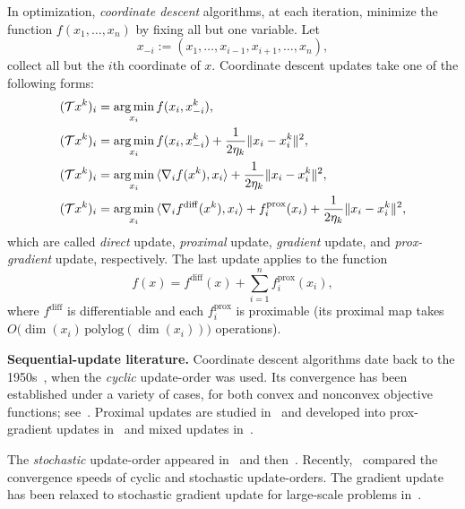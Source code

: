 In optimization,  \emph{coordinate descent} algorithms, at each iteration, minimize the function $f(x_1,\ldots,x_n)$ by fixing all but one variable. Let $$x_{-i}:=(x_1,\ldots,x_{i-1},x_{i+1},\ldots,x_n),$$
collect all but the $i$th coordinate of $x$. Coordinate descent updates take one of the following forms:
\begin{subequations}\label{coordes}
\begin{align}
(\cT x^k)_i & = \argmin_{x_i}f(x_i,x_{-i}^k),\\
(\cT x^k)_i & = \argmin_{x_i}f(x_i,x_{-i}^k)+\frac{1}{2\eta_k}\|x_i-x_i^k\|^2,\\
(\cT x^k)_i & = \argmin_{x_i}\,\langle \nabla_i f(x^k),x_i \rangle+\frac{1}{2\eta_k}\|x_i-x_i^k\|^2,\\
(\cT x^k)_i & = \argmin_{x_i}\,\langle \nabla_i f^{\mathrm{diff}}(x^k),x_i \rangle+f_i^{\mathrm{prox}}(x_i)+\frac{1}{2\eta_k}\|x_i-x_i^k\|^2,
\end{align}
\end{subequations}
which are called \emph{direct} update, \emph{proximal} update,  \emph{gradient} update, and \emph{prox-gradient} update, respectively. The last update applies to the function $$f(x) = f^{\mathrm{diff}}(x)+\sum_{i=1}^nf^{\mathrm{prox}}_i(x_i),$$ where $f^{\mathrm{diff}}$ is differentiable and each $f^{\mathrm{prox}}_i$ is proximable (its proximal map takes $O\big(\dim(x_i)\,\mathrm{polylog}(\dim(x_i))\big)$ operations).


\textbf{Sequential-update literature.} Coordinate descent algorithms date back to the 1950s~\cite{hildreth1957quadprog}, when the \emph{cyclic} update-order was used. Its convergence has been established under a variety of cases, for both convex and nonconvex objective functions; see~\cite{Warga-63,zadeh1970note, Sargent-Sebastian-73,Han-88,luo1992convergence, Tseng-93, Grippo-Sciandrone-00, Tseng-01, razaviyayn2013unified, beck2013convergence, hong2015iteration, wright2015coordinate}. Proximal updates are studied in~\cite{Grippo-Sciandrone-00, attouch2010proximal} and developed into prox-gradient updates in~\cite{tseng2009_CGD, tseng2009block-linear, bolte2014proximal} and mixed updates in~\cite{XY_2013_multiblock}.

The \emph{stochastic} update-order appeared in~\cite{nesterov2012cd} and then~\cite{richtarik2014iteration, Lu_Xiao_rbcd_2015}. Recently,~\cite{XY_2014_ecd,Xu2015_APG_NTD} compared the convergence speeds of cyclic and stochastic update-orders. The gradient update has been relaxed to  stochastic gradient update for large-scale problems in~\cite{DangLan-SBMD, XY_2015_bsg}. 

